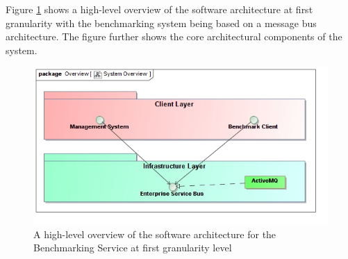 Figure \ref{fig:softwareArchitecture} shows a high-level overview of the
software architecture at first granularity with the benchmarking system being
based on a message bus  architecture. The figure further shows the core
architectural components of the system.
\begin{figure}[H]
  \begin{center}
  \includegraphics[scale=0.4]{../Diagrams and Charts/Overview/SystemOverview.jpg}
  \caption{A high-level overview of the software architecture for the Benchmarking Service at first granularity level}
  \label{fig:softwareArchitecture}
  \end{center}
\end{figure}

